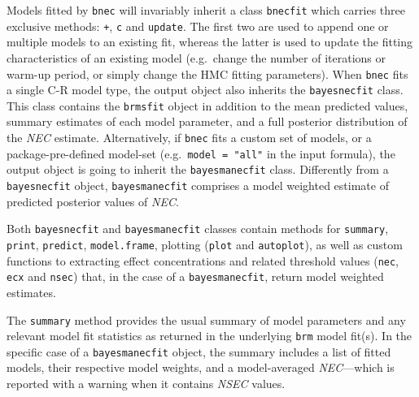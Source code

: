 Models fitted by \texttt{bnec} will invariably inherit a class
\texttt{bnecfit} which carries three exclusive methods: \texttt{+},
\texttt{c} and \texttt{update}. The first two are used to append one or
multiple models to an existing fit, whereas the latter is used to update
the fitting characteristics of an existing model (e.g.~change the number
of iterations or warm-up period, or simply change the HMC fitting
parameters). When \texttt{bnec} fits a single C-R model type, the output
object also inherits the \texttt{bayesnecfit} class. This class contains
the \texttt{brmsfit} object in addition to the mean predicted values,
summary estimates of each model parameter, and a full posterior
distribution of the \emph{NEC} estimate. Alternatively, if \texttt{bnec}
fits a custom set of models, or a package-pre-defined model-set
(e.g.~\texttt{model\ =\ "all"} in the input formula), the output object
is going to inherit the \texttt{bayesmanecfit} class. Differently from a
\texttt{bayesnecfit} object, \texttt{bayesmanecfit} comprises a model
weighted estimate of predicted posterior values of \emph{NEC}.

Both \texttt{bayesnecfit} and \texttt{bayesmanecfit} classes contain
methods for \texttt{summary}, \texttt{print}, \texttt{predict},
\texttt{model.frame}, plotting (\texttt{plot} and \texttt{autoplot}), as
well as custom functions to extracting effect concentrations and related
threshold values (\texttt{nec}, \texttt{ecx} and \texttt{nsec}) that, in
the case of a \texttt{bayesmanecfit}, return model weighted estimates.

The \texttt{summary} method provides the usual summary of model
parameters and any relevant model fit statistics as returned in the
underlying \texttt{brm} model fit(s). In the specific case of a
\texttt{bayesmanecfit} object, the summary includes a list of fitted
models, their respective model weights, and a model-averaged
\emph{NEC}---which is reported with a warning when it contains
\emph{NSEC} values.


